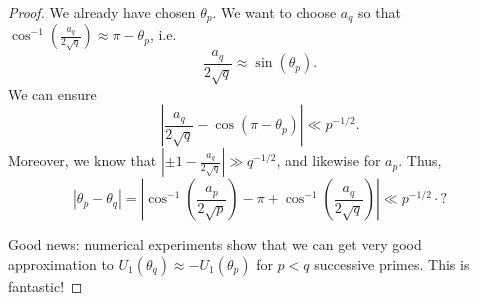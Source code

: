 \documentclass{article}
\begin{document}
\begin{proof}
We already have chosen $\theta_p$. We want to choose $a_q$ so that 
$\cos^{-1}(\frac{a_q}{2\sqrt q}) \approx \pi-\theta_p$, i.e.
\[
	\frac{a_q}{2\sqrt q} \approx \sin(\theta_p) .
\]
We can ensure 
\[
	\left| \frac{a_q}{2\sqrt q} - \cos(\pi - \theta_p)\right| \ll p^{-1/2} .
\]
Moreover, we know that $|\pm 1 - \frac{a_q}{2\sqrt q}| \gg q^{-1/2}$, and 
likewise for $a_p$. Thus, 
\[
	|\theta_p - \theta_q| = \left|\cos^{-1}\left(\frac{a_p}{2\sqrt p}\right) - \pi +  \cos^{-1}\left(\frac{a_q}{2\sqrt q}\right)\right| \ll p^{-1/2} \cdot ?
\]

Good news: numerical experiments show that we can get very good approximation 
to $U_1(\theta_q) \approx - U_1(\theta_p)$ for $p<q$ successive primes. This 
is fantastic!



\end{proof}
\end{document}
